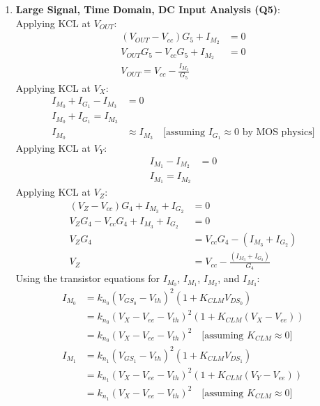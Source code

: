 \begin{enumerate}
  \item \textbf{Large Signal, Time Domain, DC Input Analysis (Q5)}:\\
    Applying KCL at $V_{OUT}$:
    \begin{align*}
      (V_{OUT} - V_{cc})G_5 + I_{M_2} &= 0 \\
      V_{OUT}G_5 - V_{cc}G_5 + I_{M_2} &= 0 \\
      V_{OUT} = V_{cc} - \frac{I_{M_2}}{G_5} \tag{1}
    \end{align*}
    Applying KCL at $V_{X}$:
    \begin{align*}
      I_{M_0} + I_{G_1} - I_{M_3} &= 0 \\
      I_{M_0} + I_{G_1} = I_{M_3} \\
      I_{M_0} &\approx I_{M_3} \quad \text{[assuming } I_{G_1} \approx 0 \text{ by MOS physics]} \tag{2}
    \end{align*}
    Applying KCL at $V_{Y}$:
    \begin{align*}
      I_{M_1} - I_{M_2} &= 0 \\
      I_{M_1} = I_{M_2} \tag{3}
    \end{align*}
    Applying KCL at $V_{Z}$:
    \begin{align*}
      (V_{Z} - V_{cc})G_4 + I_{M_3} + I_{G_2} &= 0 \\
      V_{Z}G_4 - V_{cc}G_4 + I_{M_3} + I_{G_2} &= 0 \\
      V_{Z}G_4 &= V_{cc}G_4 - (I_{M_3} + I_{G_2}) \\
      V_{Z} &= V_{cc} - \frac{(I_{M_3} + I_{G_2})}{G_4} \tag{4}
    \end{align*}
    Using the transistor equations for $I_{M_0}$, $I_{M_1}$, $I_{M_2}$, and $I_{M_3}$:
    \begin{align*}
      I_{M_0} &= k_{n_0} (V_{GS_0} - V_{th})^2 (1 + K_{CLM} V_{DS_0}) \\
              &= k_{n_0} (V_{X} - V_{ee} - V_{th})^2 (1 + K_{CLM} (V_{X} - V_{ee})) \\
              &= k_{n_0} (V_{X} - V_{ee} - V_{th})^2 \quad \text{[assuming } K_{CLM} \approx 0 \text{]} \tag{5} \\
      I_{M_1} &= k_{n_1} (V_{GS_1} - V_{th})^2 (1 + K_{CLM} V_{DS_1}) \\
              &= k_{n_1} (V_{X} - V_{ee} - V_{th})^2 (1 + K_{CLM} (V_{Y} - V_{ee})) \\
              &= k_{n_1} (V_{X} - V_{ee} - V_{th})^2 \quad \text{[assuming } K_{CLM} \approx 0 \text{]} \tag{6} \\

\end{align*}
\end{enumerate}
